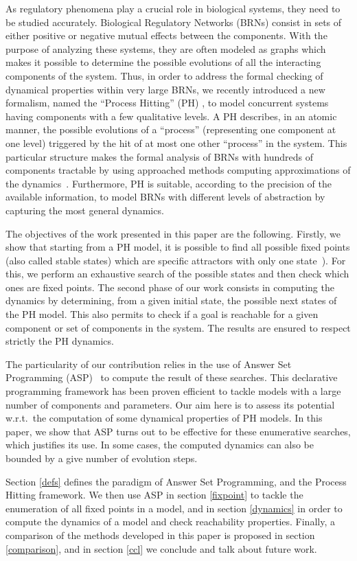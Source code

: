 As regulatory phenomena play a crucial role in biological systems, they need to
be studied accurately. Biological Regulatory Networks (BRNs) consist in sets
of either positive or negative mutual effects between the components. With the
purpose of analyzing these systems, they are often modeled as graphs which makes
it possible to determine the possible evolutions of all the interacting components of the system. Thus, in order to address the formal checking of dynamical properties within very large BRNs, we recently introduced a new formalism, named the “Process Hitting” (PH) \cite{PMR10-TCSB}, to model concurrent systems having components with a few qualitative levels. A PH describes, in an atomic manner, the possible evolutions of a “process” (representing one component at one level) triggered by the hit of at most one other “process” in the system. This particular structure makes the formal analysis of BRNs with hundreds of components tractable by using approached methods computing approximations of the dynamics~\cite{PMR12-MSCS}. Furthermore, PH is suitable, according to the precision of the available information, to model BRNs with different levels of abstraction by capturing the most general dynamics.

The objectives of the work presented in this paper are the following.
Firstly, we show that starting from a PH model, it is possible to find all possible
fixed points (also called stable states)
which are specific attractors with only one state~\cite{wuensche1998genomic}).
For this, we perform an exhaustive search of the possible states and then check which ones are fixed points.
The second phase of our work consists in computing the dynamics by determining, from a given initial state, the possible next states of the PH model.
This also permits to check if a goal is reachable for a given component or set of components in the system.
The results are ensured to respect strictly the PH dynamics.

The particularity of our contribution relies in the use of Answer Set Programming
(ASP)~\cite{baral2003knowledge}
to compute the result of these searches.
This declarative programming framework has been proven efficient
to tackle models with a large number of components and parameters.
Our aim here is to assess its potential w.r.t.\ the computation
of some dynamical properties of PH models.
In this paper, we show that ASP turns out to be effective
for these enumerative searches, which justifies its use.
In some cases, the computed dynamics can also be bounded by a give
number of evolution steps.

Section \ref{defs} defines the paradigm of Answer Set Programming,
and the Process Hitting framework.
We then use ASP in section \ref{fixpoint} to tackle the enumeration
of all fixed points in a model,
and in section \ref{dynamics} in order to compute the dynamics of a model
and check reachability properties.
Finally, a comparison of the methods developed in this paper is
proposed in section \ref{comparison},
and in section \ref{ccl} we conclude and talk about future work.

